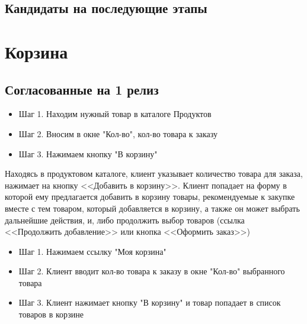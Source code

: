 
\subsection{Кандидаты на последующие этапы}


\section{Корзина}
\subsection{Согласованные на 1 релиз}
{
\begin{itemize}
\item Шаг 1. Находим нужный товар в каталоге Продуктов
\item Шаг 2. Вносим в окне "Кол-во", кол-во товара к заказу
\item Шаг 3. Нажимаем кнопку "В корзину"
\end{itemize}

Находясь в продуктовом каталоге, клиент указывает количество товара для заказа, нажимает на кнопку <<Добавить в корзину>>. 
Клиент попадает на форму в которой ему предлагается добавить в корзину товары, рекомендуемые к закупке вместе с тем товаром, который добавляется в корзину, а также он может выбрать дальнейшие действия, и, либо продолжить выбор товаров (ссылка <<Продолжить добавление>> или кнопка <<Оформить заказ>>)
}
{
\begin{itemize}
\item Шаг 1. Нажимаем ссылку "Моя корзина"
\item Шаг 2. Клиент вводит кол-во товара к заказу в окне "Кол-во" выбранного товара
\item Шаг 3. Клиент нажимает кнопку "В корзину" и товар попадает в список товаров в корзине
\end{itemize}
}

